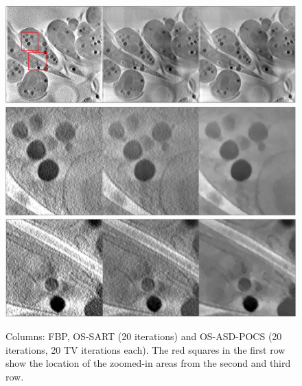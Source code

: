 \begin{figure}
\begin{center}

\includegraphics[width=\textwidth]{Applications/FBP_OSSART_TV.png} 
\includegraphics[width=\textwidth]{Applications/FBP_OSSART_TVz1.png} 
\includegraphics[width=\textwidth]{Applications/FBP_OSSART_TVz2.png} 

\end{center}

\caption[Cell image recosntructed with different algorithms 1-2]{\label{fig:OS}Columns: FBP, OS-SART (20 iterations) and OS-ASD-POCS (20 iterations, 20 TV iterations each). The red squares in the first row show the location of the zoomed-in areas from the second and third row.} 
\end{figure}


